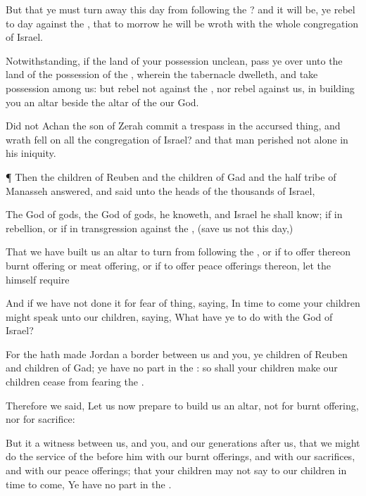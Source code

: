 {But that ye must turn
away this
day from
following the
{}? and it will be,
{} ye
rebel to
day against the
{}, that to
morrow he will be
wroth with the whole
congregation of
Israel.

Notwithstanding, if the
land of your
possession
{}
unclean,
{} pass ye
over unto the
land of the
possession of the
{}, wherein the
{}
tabernacle
dwelleth, and take
possession
among us: but
rebel not against the
{},
nor
rebel against us, in
building you an
altar
beside the
altar of the
{} our
God.

Did not
Achan the
son of
Zerah
commit a
trespass in the accursed
thing, and
wrath
fell on all the
congregation of
Israel? and that
man
perished not
alone in his
iniquity.


\par }{\PP {}¶ Then the
children of
Reuben and the
children of
Gad and the
half
tribe of
Manasseh
answered, and
said unto the
heads of the
thousands of
Israel,

The
{}
God of
gods, the
{}
God of
gods, he
knoweth, and
Israel he shall
know; if
{} in
rebellion, or if in
transgression against the
{}, (save us not this
day,)

That we have
built us an
altar to
turn from
following the
{}, or if to
offer thereon burnt
offering or meat
offering, or if to
offer
peace
offerings thereon, let the
{} himself
require
{}

And if we have not
{}
done it for
fear of
{}
thing,
saying, In time to
come your
children might
speak unto our
children,
saying, What have ye to do with the
{}
God of
Israel?

For the
{} hath
made
Jordan a
border between us and you, ye
children of
Reuben and
children of
Gad; ye have no
part in the
{}: so shall your
children
make our
children
cease
from
fearing the
{}.

Therefore we
said, Let us now
prepare to
build us an
altar, not for burnt
offering, nor for
sacrifice:

But
{} it
{} a
witness between us, and you, and our
generations
after us, that we might
do the
service of the
{}
before him with our burnt
offerings, and with our
sacrifices, and with our peace
offerings; that your
children may not
say to our
children in time to
come, Ye have no
part in the
{}.

}
